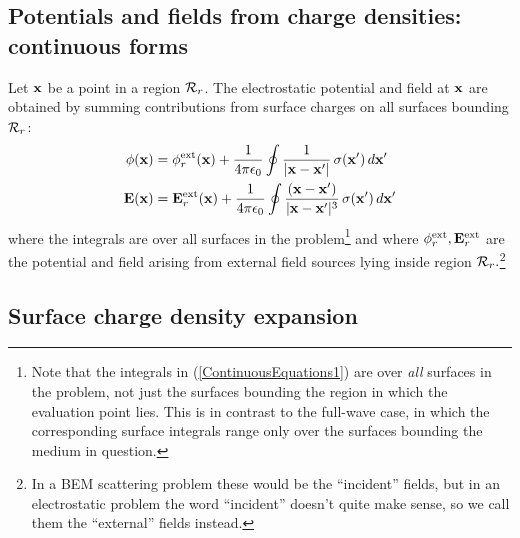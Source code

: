 \documentclass[letterpaper]{article}
\begin{document}
\subsection*{Potentials and fields from charge densities: 
             continuous forms} 

Let $\mathbf{x}$ be a point in a region $\mathcal{R}_r$. The electrostatic potential 
and field at $\mathbf{x}$ are obtained by summing contributions from
surface charges on all surfaces bounding $\mathcal{R}_r$: 
\begin{subequations}
\begin{align}
\phi(\mathbf{x}) 
&= \phi_r^{\hbox{\scriptsize{ext}}}(\mathbf{x}) 
  +\frac{1}{4\pi\epsilon_0} 
   \oint
   \frac{1}{|\mathbf{x} - \mathbf{x}^\prime|}
           \,\sigma(\mathbf{x}^\prime) \, d\mathbf{x}^\prime
\\
\mathbf{E}(\mathbf{x}) 
&= \mathbf{E}_r^{\hbox{\scriptsize{ext}}}(\mathbf{x})
  +\frac{1}{4\pi\epsilon_0}
   \oint
   \frac{(\mathbf{x}-\mathbf{x}^\prime)}
        {|\mathbf{x} - \mathbf{x}^\prime|^3}
        \,\sigma(\mathbf{x}^\prime)\,d\mathbf{x}^\prime
\end{align}
\label{ContinuousEquations1}
\end{subequations}
where the integrals are over all surfaces in the problem\footnote{Note
that the integrals in (\ref{ContinuousEquations1}) are over 
\textit{all} surfaces in the problem, not just the surfaces bounding 
the region in which the evaluation point lies. This is in contrast
to the full-wave case, in which the corresponding surface integrals
range only over the surfaces bounding the medium in question.}
and where $\phi_r^{\hbox{\scriptsize{ext}}},\mathbf{E}_r^{\hbox{\scriptsize{ext}}}$ are the potential
and field arising from external field sources lying inside
region $\mathcal{R}_r.$\footnote{In a BEM scattering problem these 
would be the ``incident'' fields, but in an electrostatic problem 
the word ``incident'' doesn't quite make sense, so we call them 
the ``external'' fields instead.}

\subsection*{Surface charge density expansion}
\end{document}
